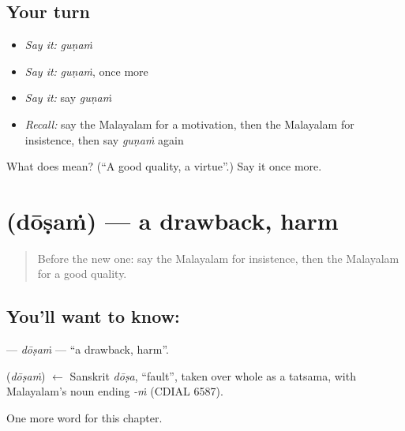 \subsection*{Your turn}
\begin{itemize}
\raggedright
  \item \emph{Say it:} \emph{guṇaṁ}
  \item \emph{Say it:} \emph{guṇaṁ}, once more
  \item \emph{Say it:} say \emph{guṇaṁ}
  \item \emph{Recall:} say the Malayalam for a motivation, then the Malayalam for insistence, then say \emph{guṇaṁ} again
\end{itemize}

\begin{tcolorbox}[breakable,colback=teal!4,colframe=teal!35!black,title={Before you move on}]
What does  mean? (\textquotedblleft{}A good quality, a virtue\textquotedblright{}.) Say it once more.
\end{tcolorbox}
\section[\texorpdfstring{\ml{ദോഷം} (dōṣaṁ)}{ദോഷം (dōṣaṁ)}]{ (dōṣaṁ) — a drawback, harm}

\label{lesson:ML-C202-dosam}



\begin{quote}
Before the new one: say the Malayalam for insistence, then the Malayalam for a good quality.
\end{quote}

\subsection*{You'll want to know: }
\textbf{} — \emph{dōṣaṁ} — \textquotedblleft{}a drawback, harm\textquotedblright{}.

\begin{cousinweb}
\textbf{} (\emph{dōṣaṁ}) $\leftarrow$ Sanskrit \emph{dōṣa}, \textquotedblleft{}fault\textquotedblright{}, taken over whole as a tatsama, with Malayalam's noun ending \emph{-ṁ} (CDIAL 6587).
\end{cousinweb}

\begin{grammarlens}[title={What you've built}]
One more word for this chapter.
\end{grammarlens}

